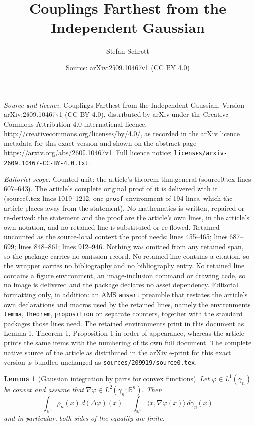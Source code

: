 \documentclass[10pt,a4paper]{amsart}
\title{Couplings Farthest from the Independent Gaussian}
\author{Stefan Schrott}
\date{Source: arXiv:2609.10467v1 (CC BY 4.0)}
\newtheorem{lemma}{Lemma}
\begin{document}
\maketitle

\noindent\emph{Source and licence.} Couplings Farthest from the Independent Gaussian. Version arXiv:2609.10467v1 (CC BY 4.0), distributed by arXiv under the Creative Commons Attribution 4.0 International licence, http://creativecommons.org/licenses/by/4.0/, as recorded in the arXiv licence metadata for this exact version and shown on the abstract page https://arxiv.org/abs/2609.10467v1. Full licence notice: \texttt{licenses/arxiv-2609.10467-CC-BY-4.0.txt}.\par\smallskip

\noindent\textit{Editorial scope.} Counted unit: the article's theorem thm:general (source0.tex lines 607--643). The article's complete original proof of it is delivered with it (source0.tex lines 1019--1212, one \texttt{proof} environment of 194 lines, which the article places away from the statement). No mathematics is written, repaired or re-derived: the statement and the proof are the article's own lines, in the article's own notation, and no retained line is substituted or re-flowed.  Retained uncounted as the source-local context the proof needs: lines 455--465; lines 687--699; lines 848--861; lines 912--946.  Nothing was omitted from any retained span, so the package carries no omission record.  No retained line contains a citation, so the wrapper carries no bibliography and no bibliography entry.  No retained line contains a figure environment, an image-inclusion command or drawing code, so no image is delivered and the package declares no asset dependency.  Editorial formatting only, in addition: an AMS \texttt{amsart} preamble that restates the article's own declarations and macros used by the retained lines, namely the environments \texttt{lemma}, \texttt{theorem}, \texttt{proposition} on separate counters, together with the standard packages those lines need.  The retained environments print in this document as Lemma 1, Theorem 1, Proposition 1 in order of appearance, whereas the article prints the same items with the numbering of its own full document.  The complete native source of the article as distributed in the arXiv e-print for this exact version is bundled unchanged as \texttt{sources/209919/source0.tex}.
\begin{lemma}[Gaussian integration by parts for convex functions]\label{lem:GaussPartInt}
Let $\varphi \in L^1(\gamma_n)$ be convex and assume that
$\nabla\varphi\in L^2(\gamma_n;\mathbb R^n)$. Then
\[
    \int_{\mathbb R^n} \rho_n(x)\,d(\Delta\varphi)(x)
    =
    \int_{\mathbb R^n}
        \langle x,\nabla\varphi(x)\rangle\,d\gamma_n(x)
\]
and in particular, both sides of the equality are finite. 
\end{lemma}
\end{document}

